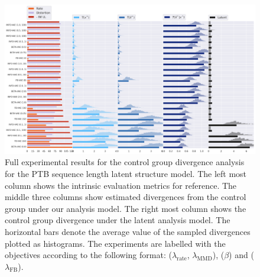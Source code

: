 \begin{figure}[!htb]
    \centering
    \includegraphics[width=\textwidth]{images/kl_plots/ptb_sequence_len_selection_False.png}
    \caption{Full experimental results for the control group divergence analysis for the PTB sequence length latent structure model. The left most column shows the intrinsic evaluation metrics for reference. The middle three columns show estimated divergences from the control group under our analysis model. The right most column shows the control group divergence under the latent analysis model. The horizontal bars denote the average value of the sampled divergences plotted as histograms. The experiments are labelled with the objectives according to the following format: \infovae ($\lambda_{\text{rate}}$, $\lambda_{\text{MMD}}$), \betavae ($\beta$) and \fbvae ($\lambda_{\text{FB}}$). }
    \label{fig:kl-plot-ptb-seq-len}
\end{figure}


